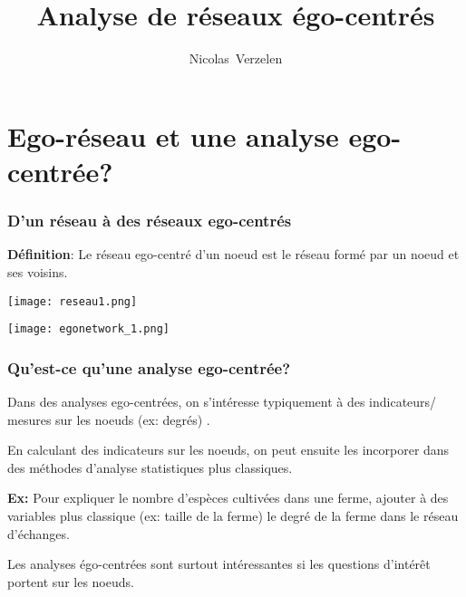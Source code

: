 \documentclass{beamer}
\title[Ego-Network]{Analyse de réseaux égo-centrés}
\author[Nicolas Verzelen]{Nicolas~Verzelen}
\institute[INRA]{INRA}
\date[Formation Analyse de réseaux]{}
\begin{document}
\section{Ego-réseau et une analyse ego-centrée?}



\begin{frame}
 \frametitle{D'un réseau à des réseaux ego-centrés}
 
 {\bf Définition}: Le réseau ego-centré d'un noeud est le réseau formé par un noeud et ses voisins. 
 
 \begin{center}
 \texttt{[image: reseau1.png]} 
 
 \texttt{[image: egonetwork\_1.png]} 
  
 \end{center}

 
 
\end{frame}


\begin{frame}
 \frametitle{Qu'est-ce qu'une analyse ego-centrée?}
 
 

Dans des analyses ego-centrées, on s'intéresse typiquement à des indicateurs/ mesures sur les noeuds (ex: degrés) . 

 
 

 \medskip 
 
 En calculant des indicateurs sur les noeuds, on peut ensuite les incorporer dans des méthodes d'analyse statistiques plus classiques.
 
 
 {\bf Ex: } Pour expliquer le nombre d'espèces cultivées dans une ferme, ajouter à des variables plus classique (ex: taille de la ferme) le degré de la ferme dans le réseau d'échanges. 
 
 
 
 \bigskip 
 
 
 Les analyses égo-centrées sont surtout intéressantes si les questions d'intérêt portent sur les noeuds. 
 
 
\end{frame}
\end{document}
